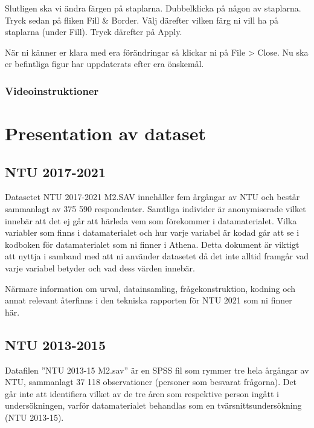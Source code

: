 \documentclass[
]{book}
\begin{document}
Slutligen ska vi ändra färgen på staplarna. Dubbelklicka på någon av staplarna. Tryck sedan på fliken Fill \& Border. Välj därefter vilken färg ni vill ha på staplarna (under Fill). Tryck därefter på Apply.

När ni känner er klara med era förändringar så klickar ni på File \textgreater{} Close. Nu ska er befintliga figur har uppdaterats efter era önskemål.

\hypertarget{videoinstruktioner-12}{%
\subsection{Videoinstruktioner}\label{videoinstruktioner-12}}

\hypertarget{presentation-av-dataset}{%
\chapter{Presentation av dataset}\label{presentation-av-dataset}}

\hypertarget{ntu-2017-2021}{%
\section{NTU 2017-2021}\label{ntu-2017-2021}}

Datasetet NTU 2017-2021 M2.SAV innehåller fem årgångar av NTU och består sammanlagt av 375 590 respondenter. Samtliga individer är anonymiserade vilket innebär att det ej går att härleda vem som förekommer i datamaterialet. Vilka variabler som finns i datamaterialet och hur varje variabel är kodad går att se i kodboken för datamaterialet som ni finner i Athena. Detta dokument är viktigt att nyttja i samband med att ni använder datasetet då det inte alltid framgår vad varje variabel betyder och vad dess värden innebär.

Närmare information om urval, datainsamling, frågekonstruktion, kodning och annat relevant återfinns i den
tekniska rapporten för NTU 2021 som ni finner här.

\hypertarget{ntu-2013-2015}{%
\section{NTU 2013-2015}\label{ntu-2013-2015}}

Datafilen ''NTU 2013-15 M2.sav'' är en SPSS fil som rymmer tre hela årgångar av NTU,
sammanlagt 37 118 observationer (personer som besvarat frågorna). Det går inte att identifiera
vilket av de tre åren som respektive person ingått i undersökningen, varför datamaterialet
behandlas som en tvärsnittsundersökning (NTU 2013-15).
\end{document}
